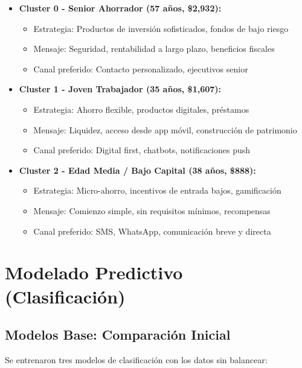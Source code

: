 \documentclass[12pt,letterpaper]{article}
\begin{document}
\begin{itemize}
    \item \textbf{Cluster 0 - Senior Ahorrador (57 años, \$2,932):}
    \begin{itemize}
        \item Estrategia: Productos de inversión sofisticados, fondos de bajo riesgo
        \item Mensaje: Seguridad, rentabilidad a largo plazo, beneficios fiscales
        \item Canal preferido: Contacto personalizado, ejecutivos senior
    \end{itemize}
    
    \item \textbf{Cluster 1 - Joven Trabajador (35 años, \$1,607):}
    \begin{itemize}
        \item Estrategia: Ahorro flexible, productos digitales, préstamos
        \item Mensaje: Liquidez, acceso desde app móvil, construcción de patrimonio
        \item Canal preferido: Digital first, chatbots, notificaciones push
    \end{itemize}
    
    \item \textbf{Cluster 2 - Edad Media / Bajo Capital (38 años, \$888):}
    \begin{itemize}
        \item Estrategia: Micro-ahorro, incentivos de entrada bajos, gamificación
        \item Mensaje: Comienzo simple, sin requisitos mínimos, recompensas
        \item Canal preferido: SMS, WhatsApp, comunicación breve y directa
    \end{itemize}
\end{itemize}

\section{Modelado Predictivo (Clasificación)}

\subsection{Modelos Base: Comparación Inicial}

Se entrenaron tres modelos de clasificación con los datos sin balancear:
\end{document}
